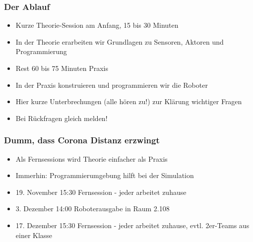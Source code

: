 \documentclass{beamer}
\begin{document}
\begin{frame}
\frametitle{Der Ablauf}
\begin{itemize}
\item Kurze Theorie-Session am Anfang, 15 bis 30 Minuten
\item In der Theorie erarbeiten wir Grundlagen zu Sensoren, Aktoren und Programmierung
\item Rest 60 bis 75 Minuten Praxis 
\item In der Praxis konstruieren und programmieren wir die Roboter
\item Hier kurze Unterbrechungen (alle hören zu!) zur Klärung wichtiger Fragen
\item Bei Rückfragen gleich melden!
\end{itemize}

\end{frame}

\begin{frame}
\frametitle{Dumm, dass Corona Distanz erzwingt}
\begin{itemize}
\item Als Fernsessions wird Theorie einfacher als Praxis
\item Immerhin: Programmierumgebung hilft bei der Simulation
\item 19. November 15:30 Fernsession - jeder arbeitet zuhause
\item 3. Dezember 14:00 Roboterausgabe in Raum 2.108
\item 17. Dezember 15:30 Fernsession - jeder arbeitet zuhause, evtl. 2er-Teams aus einer Klasse
\end{itemize}



\end{frame}

\end{document}
